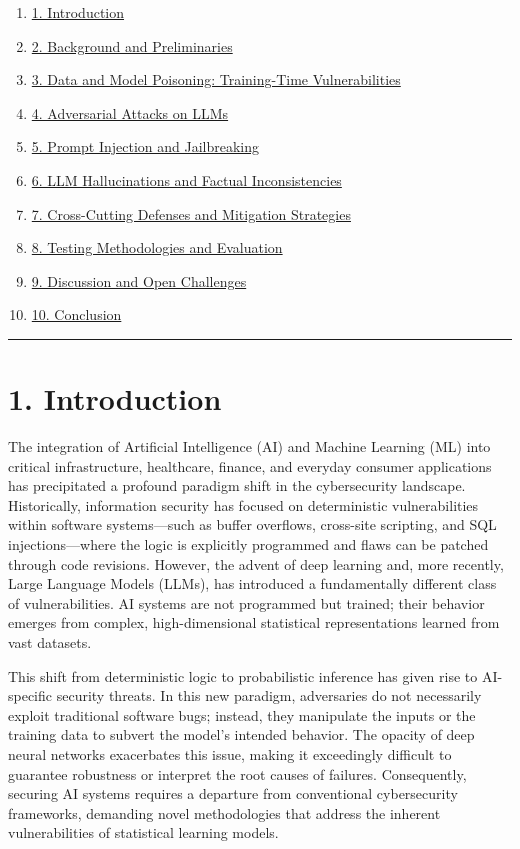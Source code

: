 \documentclass[11pt,a4paper]{article}
\begin{document}
\begin{enumerate}
 \item \href{#1-introduction}{1. Introduction}
 \item \href{#2-background-and-preliminaries}{2. Background and Preliminaries}
 \item \href{#3-data-and-model-poisoning-training-time-vulnerabilities}{3. Data and Model Poisoning: Training-Time Vulnerabilities}
 \item \href{#4-adversarial-attacks-on-llms}{4. Adversarial Attacks on LLMs}
 \item \href{#5-prompt-injection-and-jailbreaking}{5. Prompt Injection and Jailbreaking}
 \item \href{#6-llm-hallucinations-and-factual-inconsistencies}{6. LLM Hallucinations and Factual Inconsistencies}
 \item \href{#8-cross-cutting-defenses-and-mitigation-strategies}{7. Cross-Cutting Defenses and Mitigation Strategies}
 \item \href{#7-testing-methodologies-and-evaluation}{8. Testing Methodologies and Evaluation}
 \item \href{#9-discussion-and-open-challenges}{9. Discussion and Open Challenges}
 \item \href{#10-conclusion}{10. Conclusion}
\end{enumerate}
\noindent\rule{\textwidth}{0.4pt}
\section{1. Introduction}

The integration of Artificial Intelligence (AI) and Machine Learning (ML) into critical infrastructure, healthcare, finance, and everyday consumer applications has precipitated a profound paradigm shift in the cybersecurity landscape. Historically, information security has focused on deterministic vulnerabilities within software systems---such as buffer overflows, cross-site scripting, and SQL injections---where the logic is explicitly programmed and flaws can be patched through code revisions. However, the advent of deep learning and, more recently, Large Language Models (LLMs), has introduced a fundamentally different class of vulnerabilities. AI systems are not programmed but trained; their behavior emerges from complex, high-dimensional statistical representations learned from vast datasets. 

This shift from deterministic logic to probabilistic inference has given rise to AI-specific security threats. In this new paradigm, adversaries do not necessarily exploit traditional software bugs; instead, they manipulate the inputs or the training data to subvert the model's intended behavior. The opacity of deep neural networks exacerbates this issue, making it exceedingly difficult to guarantee robustness or interpret the root causes of failures. Consequently, securing AI systems requires a departure from conventional cybersecurity frameworks, demanding novel methodologies that address the inherent vulnerabilities of statistical learning models.
\end{document}
